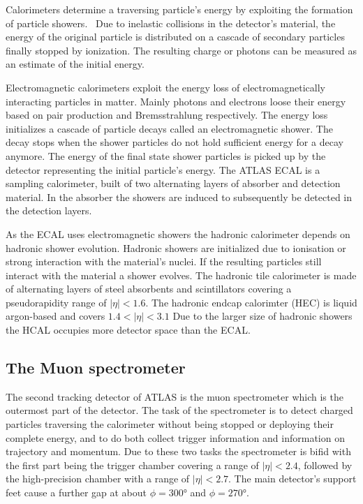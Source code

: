 Calorimeters determine a traversing particle's energy by exploiting the formation of particle showers.~\cite{wermes} Due to inelastic collisions in the detector's material, the energy of the original particle is distributed on a cascade of secondary particles finally stopped by ionization. The resulting charge or photons can be measured as an estimate of the initial energy.

Electromagnetic calorimeters exploit the energy loss of electromagnetically interacting particles in matter. Mainly photons and electrons loose their energy based on pair production and Bremsstrahlung respectively. The energy loss initializes a cascade of particle decays called an electromagnetic shower. The decay stops when the shower particles do not hold sufficient energy for a decay anymore. The energy of the final state shower particles is picked up by the detector representing the initial particle's energy.
The ATLAS ECAL is a sampling calorimeter, built of two alternating layers of absorber and detection material. In the absorber the showers are induced to subsequently be detected in the detection layers.


As the ECAL uses electromagnetic showers the hadronic calorimeter depends on hadronic shower evolution. Hadronic showers are initialized due to ionisation or strong interaction with the material's nuclei. If the resulting particles still interact with the material a shower evolves.
The hadronic tile calorimeter is made of alternating layers of steel absorbents and scintillators covering a pseudorapidity range of $|\eta| < 1.6$.
The hadronic endcap calorimter (HEC) is liquid argon-based and covers $1.4 < |\eta| < 3.1$
Due to the larger size of hadronic showers the HCAL occupies more detector space than the ECAL.


\subsection{The Muon spectrometer}

The second tracking detector of ATLAS is the muon spectrometer which is the outermost part of the detector. The task of the spectrometer is to detect charged particles traversing the calorimeter without being stopped or deploying their complete energy, and to do both collect trigger information and information on trajectory and momentum. Due to these two tasks the spectrometer is bifid with the first part being the trigger chamber covering a range of $|\eta|<2.4$, followed by the high-precision chamber with a range of $|\eta|<2.7$. The main detector's support feet cause a further gap at about $\phi = \ang{300}$ and $\phi = \ang{270}$.

